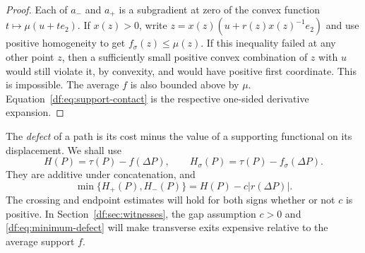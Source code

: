 \begin{proof}
Each of $a_-$ and $a_+$ is a subgradient at zero of the convex
function $t\mapsto\mu(u+te_2)$. If $x(z)>0$, write
$z=x(z)(u+r(z)x(z)^{-1}e_2)$ and use positive homogeneity to get
$f_\sigma(z)\le\mu(z)$. If this inequality failed at any other
point $z$, then a sufficiently small positive convex combination of
$z$ with $u$ would still violate it, by convexity, and would have
positive first coordinate. This is impossible. The average $f$ is
also bounded above by $\mu$. Equation~\eqref{df:eq:support-contact}
is the respective one-sided derivative expansion.
\end{proof}

The \emph{defect} of a path is its cost minus the value of a supporting
functional on its displacement. We shall use
\begin{equation}\label{df:eq:defects}
 H(P)=\tau(P)-f(\Delta P),\qquad
 H_\sigma(P)=\tau(P)-f_\sigma(\Delta P).
\end{equation}
They are additive under concatenation, and
\begin{equation}\label{df:eq:minimum-defect}
 \min\{H_+(P),H_-(P)\}=H(P)-c|r(\Delta P)|.
\end{equation}
The crossing and endpoint estimates will hold for both signs whether
or not $c$ is positive. In Section~\ref{df:sec:witnesses}, the gap
assumption $c>0$ and \eqref{df:eq:minimum-defect} will make transverse
exits expensive relative to the average support $f$.
